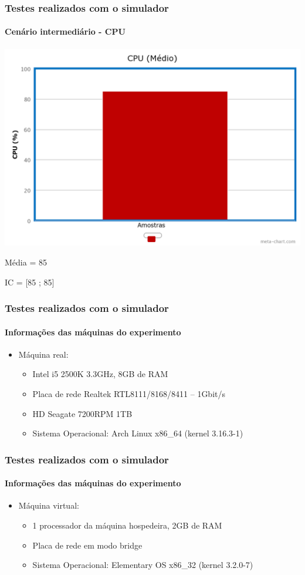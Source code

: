 \documentclass{beamer}
\begin{document}
\begin{frame}
	\frametitle{Testes realizados com o simulador}
	\framesubtitle{Cenário intermediário - CPU}
	\begin{center}
	\includegraphics[scale=0.18]{chart(3).png}
	\end{center}
	\begin{center}
	Média = 85
	\end{center}
	\begin{center}
	IC = [85 ; 85]
	\end{center}
\end{frame}

\begin{frame}
	\frametitle{Testes realizados com o simulador}
	\framesubtitle{Informações das máquinas do experimento}
	\begin{itemize}
		\item Máquina real:
			\begin{itemize}
				\item Intel i5 2500K 3.3GHz, 8GB de RAM
				\item Placa de rede Realtek RTL8111/8168/8411 – 1Gbit/s
				\item HD Seagate 7200RPM 1TB
				\item Sistema Operacional: Arch Linux x86\_64 (kernel 3.16.3-1)
			\end{itemize}
	\end{itemize}
\end{frame}

\begin{frame}
	\frametitle{Testes realizados com o simulador}
	\framesubtitle{Informações das máquinas do experimento}
	\begin{itemize}
		\item Máquina virtual:
			\begin{itemize}
				\item 1 processador da máquina hospedeira, 2GB de RAM
				\item Placa de rede em modo bridge
				\item Sistema Operacional: Elementary OS x86\_32 (kernel 3.2.0-7)
			\end{itemize}
	\end{itemize}
\end{frame}
\end{document}
